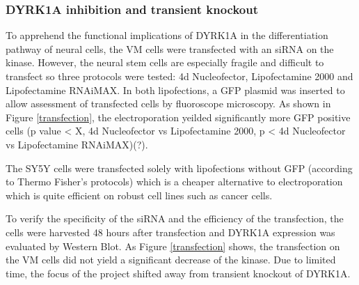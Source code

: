 \documentclass[onecolumn,10pt]{asme2ej}
\begin{document}
\subsubsection{DYRK1A inhibition and transient knockout}
To apprehend the functional implications of DYRK1A in the differentiation pathway of neural cells, the VM cells were transfected with an siRNA on the kinase. However, the neural stem cells are especially fragile and difficult to transfect so three protocols were tested:  4d Nucleofector, Lipofectamine 2000 and Lipofectamine RNAiMAX. 
In both lipofections, a GFP plasmid was inserted to allow assessment of transfected cells by fluoroscope microscopy.
As shown in Figure \ref{transfection}, the electroporation yeilded significantly more GFP positive cells (p value < X, 4d Nucleofector vs Lipofectamine 2000, p < 4d Nucleofector vs Lipofectamine RNAiMAX)(?). 



The SY5Y cells were transfected solely with lipofections without GFP (according to Thermo Fisher's protocols) which is a cheaper alternative to electroporation which is quite efficient on robust cell lines such as cancer cells. 

To verify the specificity of the siRNA and the efficiency of the transfection, the cells were harvested 48 hours after transfection and DYRK1A expression was evaluated by Western Blot. As Figure \ref{transfection} shows, the transfection on the VM cells did not yield a significant decrease of the kinase. Due to limited time, the focus of the project shifted away from transient knockout of DYRK1A.
\end{document}
